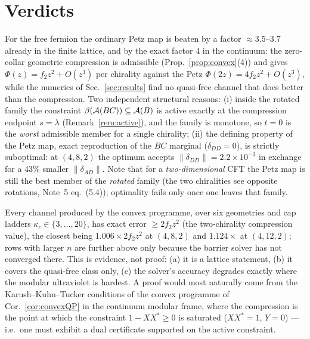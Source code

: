 \documentclass[11pt]{article}
\begin{document}
\section{Verdicts}\label{sec:verdicts}

\begin{verdictbreak}
For the free fermion the ordinary Petz map is beaten by a factor
\(\approx3.5\)--\(3.7\) already in the finite lattice, and by the exact factor
\(4\) in the continuum: the zero-collar geometric compression is admissible
(Prop.~\ref{prop:convex}(4)) and gives \(\Phi(z)=f_2z^2+O(z^3)\) per chirality
against the Petz \(\Phi(2z)=4f_2z^2+O(z^3)\), while the numerics of
Sec.~\ref{sec:results} find no quasi-free channel that does better than the
compression.  Two independent structural reasons: (i) inside the rotated family
the constraint \(\beta(\mathcal A(BC))\subseteq\mathcal A(B)\) is active exactly at the
compression endpoint \(s=\lambda\) (Remark~\ref{rem:active}), and the family is
monotone, so \(t=0\) is the \emph{worst} admissible member for a single
chirality; (ii) the defining property of the Petz map, exact reproduction of the
\(BC\) marginal (\(\delta_{DD}=0\)), is strictly suboptimal: at \((4,8,2)\) the
optimum accepts \(\|\delta_{DD}\|=2.2\times10^{-3}\) in exchange for a \(43\%\)
smaller \(\|\delta_{AD}\|\).  Note that for a \emph{two-dimensional} CFT the
Petz map is still the best member of the \emph{rotated} family (the two
chiralities see opposite rotations, Note~5 eq.~(5.4)); optimality fails only
once one leaves that family.
\end{verdictbreak}

\begin{verdictgap}
Every channel produced by the convex programme, over six geometries and cap
ladders \(\kappa_c\in\{3,\dots,20\}\), has exact error
\(\ge 2f_2z^2\) (the two-chirality compression value), the closest being
\(1.006\times2f_2z^2\) at \((4,8,2)\) and \(1.124\times\) at \((4,12,2)\);
rows with larger \(n\) are further above only because the barrier solver has not
converged there.  This is evidence, not proof: (a) it is a lattice statement,
(b) it covers the quasi-free class only, (c) the solver's accuracy degrades
exactly where the modular ultraviolet is hardest.  A proof would most naturally
come from the Karush--Kuhn--Tucker conditions of the convex programme of
Cor.~\ref{cor:convexQP} in the continuum modular frame, where the compression is
the point at which the constraint \(1-XX^*\ge0\) is saturated
(\(XX^*=1\), \(Y=0\)) --- i.e.\ one must exhibit a dual certificate supported on
the active constraint.
\end{verdictgap}
\end{document}

